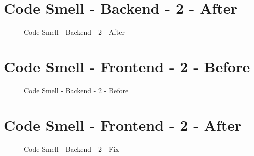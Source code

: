 \section{Code Smell - Backend - 2 - After} \label{a.4.backend.codesmell2.after}
\begin{figure}[h]
	\centering
	\caption{Code Smell - Backend - 2 - After}
	\label{a.1.aggregate}
\end{figure}

\newpage

\section{Code Smell - Frontend - 2 - Before} \label{a.4.frontend.codesmell1.before}
\begin{figure}[h]
	\centering
	\caption{Code Smell - Backend - 2 - Before}
	\label{a.1.aggregate}
\end{figure}

\section{Code Smell - Frontend - 2 - After} \label{a.4.frontend.codesmell1.after}
\begin{figure}[h]
	\centering
	\caption{Code Smell - Backend - 2 - Fix}
	\label{a.1.aggregate}
\end{figure}

\newpage
